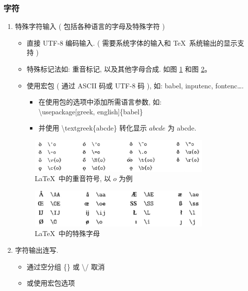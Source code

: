 \documentclass[UTF8]{ctexart}
\begin{document}
        \subsubsection{字符}
            \begin{enumerate}

                \item 特殊字符输入 ( 包括各种语言的字母及特殊字符 )
                \begin{itemize}
                    \item 直接 UTF-8 编码输入. ( 需要系统字体的输入和 \TeX\ 系统输出的显示支持 )
                    \item 特殊标记法如: 重音标记, 以及其他字母合成. 如图 \ref{fig:zhongyin} 和图 \ref{fig:teshu}。
                    \item 使用宏包 ( 通过 ASCII 码或 UTF-8 码 ), 如: babel, inputenc, fontenc\dots. 

                    \begin{itemize}
                        \item 在使用包的选项中添加所需语言参数, 如: \\\textbackslash usepackage[greek, english]\{babel\}
                        \item 并使用 \textbackslash textgreek\{abcde\} 转化显示 $abcde$ 为 \textgreek{abcde}. 
                    \end{itemize}
                \end{itemize}

                \begin{figure}[ht]
                    \centering
                    \includegraphics[width=9cm]{figures/zhongyin.png}
                    \caption{\LaTeX\ 中的重音符号, 以 $o$ 为例}
                    \label{fig:zhongyin}
                \end{figure}
                \begin{figure}[ht]
                    \centering
                    \includegraphics[width=9cm]{figures/teshu.PNG}
                    \caption{\LaTeX\ 中的特殊字母}
                    \label{fig:teshu}
                \end{figure}

                \item 字符输出连写. 
                \begin{itemize}
                    \item 通过空分组 \{\} 或 \textbackslash/ 取消
                    \item 或使用宏包选项
                \end{itemize}

            \end{enumerate}
\end{document}

